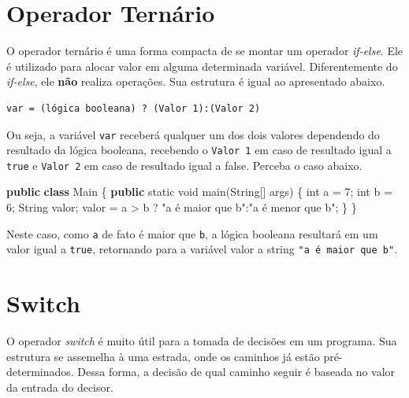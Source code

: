 \documentclass[
]{book}
\newenvironment{Shaded}{\begin{snugshade}}{\end{snugshade}}
\newcommand{\BuiltInTok}[1]{#1}
\newcommand{\DataTypeTok}[1]{\textcolor[rgb]{0.13,0.29,0.53}{#1}}
\newcommand{\DecValTok}[1]{\textcolor[rgb]{0.00,0.00,0.81}{#1}}
\newcommand{\FunctionTok}[1]{\textcolor[rgb]{0.00,0.00,0.00}{#1}}
\newcommand{\KeywordTok}[1]{\textcolor[rgb]{0.13,0.29,0.53}{\textbf{#1}}}
\newcommand{\NormalTok}[1]{#1}
\newcommand{\StringTok}[1]{\textcolor[rgb]{0.31,0.60,0.02}{#1}}
\begin{document}
\hypertarget{operador-ternuxe1rio}{%
\section{Operador Ternário}\label{operador-ternuxe1rio}}

O operador ternário é uma forma compacta de se montar um operador \emph{if-else}. Ele é utilizado para alocar valor em alguma determinada variável. Diferentemente do \emph{if-else}, ele \textbf{não} realiza operações. Sua estrutura é igual ao apresentado abaixo.

\begin{verbatim}
var = (lógica booleana) ? (Valor 1):(Valor 2)
\end{verbatim}

Ou seja, a variável \texttt{var} receberá qualquer um dos dois valores dependendo do resultado da lógica booleana, recebendo o \texttt{Valor\ 1} em caso de resultado igual a \texttt{true} e \texttt{Valor\ 2} em caso de resultado igual a false. Perceba o caso abaixo.

\begin{Shaded}
\begin{Highlighting}[]
\KeywordTok{public} \KeywordTok{class}\NormalTok{ Main \{}
    \KeywordTok{public} \DataTypeTok{static} \DataTypeTok{void} \FunctionTok{main}\NormalTok{(}\BuiltInTok{String}\NormalTok{[] args) \{}
        \DataTypeTok{int}\NormalTok{ a = }\DecValTok{7}\NormalTok{;}
        \DataTypeTok{int}\NormalTok{ b = }\DecValTok{6}\NormalTok{;}
        \BuiltInTok{String}\NormalTok{ valor;}
\NormalTok{        valor = a > b ? }\StringTok{"a é maior que b"}\NormalTok{:}\StringTok{"a é menor que b"}\NormalTok{;}
\NormalTok{    \}}
\NormalTok{\}}
\end{Highlighting}
\end{Shaded}

Neste caso, como \texttt{a} de fato é maior que \texttt{b}, a lógica booleana resultará em um valor igual a \texttt{true}, retornando para a variável valor a string \texttt{"a\ é\ maior\ que\ b"}.

\hypertarget{switch}{%
\section{Switch}\label{switch}}

O operador \emph{switch} é muito útil para a tomada de decisões em um programa. Sua estrutura se assemelha à uma estrada, onde os caminhos já estão pré-determinados. Dessa forma, a decisão de qual caminho seguir é baseada no valor da entrada do decisor.
\end{document}
